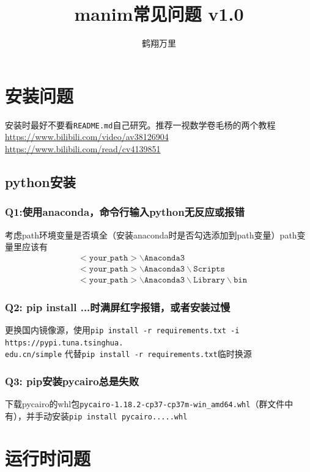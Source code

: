 \documentclass[UTF8]{ctexart}
\title{manim常见问题 v1.0}
\author{鹤翔万里}
\begin{document}
\maketitle
\tableofcontents
\newpage

\section{安装问题}

安装时最好不要看\texttt{README.md}自己研究。推荐一视数学卷毛杨的两个教程\url{https://www.bilibili.com/video/av38126904}
\qquad\url{https://www.bilibili.com/read/cv4139851}

\subsection{python安装}

\subsubsection*{Q1:使用anaconda，命令行输入python无反应或报错}
考虑path环境变量是否填全（安装anaconda时是否勾选添加到path变量）path变量里应该有
\begin{align*}
&\mathtt{<your\_path>\backslash Anaconda3}\\
&\mathtt{<your\_path>\backslash Anaconda3\backslash Scripts}\\
&\mathtt{<your\_path>\backslash Anaconda3\backslash Library\backslash bin}
\end{align*}

\subsubsection*{Q2: pip install ...时满屏红字报错，或者安装过慢}
更换国内镜像源，使用\texttt{pip install -r requirements.txt -i https://pypi.tuna.tsinghua.\\edu.cn/simple}
代替\texttt{pip install -r requirements.txt}临时换源

\subsubsection*{Q3: pip安装pycairo总是失败}
下载pycairo的whl包\texttt{pycairo-1.18.2-cp37-cp37m-win\_amd64.whl}（群文件中有），并手动安装\texttt{pip install pycairo.....whl}

\section{运行时问题}
\end{document}
